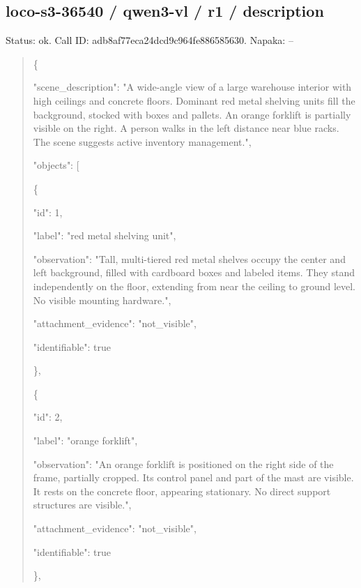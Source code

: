 \documentclass[10pt,a4paper]{article}
\begin{document}
\subsection*{loco-s3-36540 / qwen3-vl / r1 / description}
Status: ok. Call ID: adb8af77eca24dcd9c964fe886585630. Napaka: --
\begin{quote}\footnotesize
\{\par
  "scene\_description":\allowbreak{} "A wide-angle view of a large warehouse interior with high ceilings and concrete floors. Dominant red metal shelving units fill the background,\allowbreak{} stocked with boxes and pallets. An orange forklift is partially visible on the right. A person walks in the left distance near blue racks. The scene suggests active inventory management.",\allowbreak{}\par
  "objects":\allowbreak{} [\par
    \{\par
      "id":\allowbreak{} 1,\allowbreak{}\par
      "label":\allowbreak{} "red metal shelving unit",\allowbreak{}\par
      "observation":\allowbreak{} "Tall,\allowbreak{} multi-tiered red metal shelves occupy the center and left background,\allowbreak{} filled with cardboard boxes and labeled items. They stand independently on the floor,\allowbreak{} extending from near the ceiling to ground level. No visible mounting hardware.",\allowbreak{}\par
      "attachment\_evidence":\allowbreak{} "not\_visible",\allowbreak{}\par
      "identifiable":\allowbreak{} true\par
    \},\allowbreak{}\par
    \{\par
      "id":\allowbreak{} 2,\allowbreak{}\par
      "label":\allowbreak{} "orange forklift",\allowbreak{}\par
      "observation":\allowbreak{} "An orange forklift is positioned on the right side of the frame,\allowbreak{} partially cropped. Its control panel and part of the mast are visible. It rests on the concrete floor,\allowbreak{} appearing stationary. No direct support structures are visible.",\allowbreak{}\par
      "attachment\_evidence":\allowbreak{} "not\_visible",\allowbreak{}\par
      "identifiable":\allowbreak{} true\par
    \},\allowbreak{}\par

\end{quote}
\end{document}
